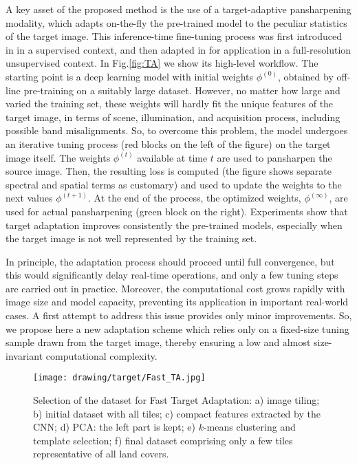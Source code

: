 \documentclass[journal]{IEEEtran}
\begin{document}
A key asset of the proposed method is the use of a target-adaptive pansharpening modality,
which adapts on-the-fly the pre-trained model to the peculiar statistics of the target image.
This inference-time fine-tuning process was first introduced in \cite{Scarpa2018a} in a supervised context,
and then adapted in \cite{Ciotola2022} for application in a full-resolution unsupervised context.
In Fig.\ref{fig:TA} we show its high-level workflow.
The starting point is a deep learning model with initial weights $\phi^{(0)}$, obtained by off-line pre-training on a suitably large dataset.
However, no matter how large and varied the training set,
these weights will hardly fit the unique features of the target image, in terms of scene, illumination, and acquisition process, including possible band misalignments.
So, to overcome this problem, the model undergoes an iterative tuning process (red blocks on the left of the figure) on the target image itself.
The weights $\phi^{(t)}$ available at time $t$ are used to pansharpen the source image.
Then, the resulting loss is computed (the figure shows separate spectral and spatial terms as customary) and used to update the weights to the next values $\phi^{(t+1)}$.
At the end of the process, the optimized weights, $\phi^{(\infty)}$, are used for actual pansharpening (green block on the right).
Experiments show that target adaptation improves consistently the pre-trained models,
especially when the target image is not well represented by the training set.

In principle,
the adaptation process should proceed until full convergence, but this would significantly delay real-time operations, and only a few tuning steps are carried out in practice.
Moreover, the computational cost grows rapidly with image size and model capacity, preventing its application in important real-world cases.
A first attempt to address this issue \cite{Ciotola2023} provides only minor improvements.
So, we propose here a new adaptation scheme which relies only on a fixed-size tuning sample drawn from the target image,
thereby ensuring a low and almost size-invariant computational complexity.

\begin{figure}
\centering
\texttt{[image: drawing/target/Fast\_TA.jpg]} \\
\caption{Selection of the dataset for Fast Target Adaptation:
a) image tiling;
b) initial dataset with all tiles;
c) compact features extracted by the CNN;
d) PCA: the left part is kept;
e) $k$-means clustering and template selection;
f) final dataset comprising only a few tiles representative of all land covers.
}
\label{fig:FastTA}
\end{figure}
\end{document}

